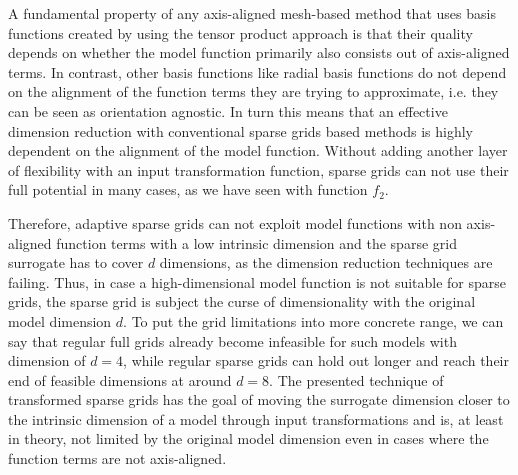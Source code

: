 \documentclass[
  a4paper,  %
  twoside,  %
  bibliography=totoc,
  headsepline,
  cleardoublepage=empty,
  parskip=half,
  draft=false
]{scrbook}
\begin{document}
A fundamental property of any axis-aligned mesh-based method that uses basis functions created by using the tensor product approach is that their quality depends on whether the model function primarily also consists out of axis-aligned terms.
In contrast, other basis functions like radial basis functions do not depend on the alignment of the function terms they are trying to approximate, i.e. they can be seen as orientation agnostic.
In turn this means that an effective dimension reduction with conventional sparse grids based methods is highly dependent on the alignment of the model function.
Without adding another layer of flexibility with an input transformation function, sparse grids can not use their full potential in many cases, as we have seen with function $f_2$.

Therefore, adaptive sparse grids can not exploit model functions with non axis-aligned function terms with a low intrinsic dimension and the sparse grid surrogate has to cover $d$ dimensions, as the dimension reduction techniques are failing.
Thus, in case a high-dimensional model function is not suitable for sparse grids, the sparse grid is subject the curse of dimensionality with the original model dimension $d$.
To put the grid limitations into more concrete range, we can say that regular full grids already become infeasible for such  models with dimension of $d=4$, while regular sparse grids can hold out longer and reach their end of feasible dimensions at around $d=8$.
The presented technique of transformed sparse grids has the goal of moving the surrogate dimension closer to the intrinsic dimension of a model through input transformations and is, at least in theory, not limited by the original model dimension even in cases where the function terms are not axis-aligned.
\end{document}
